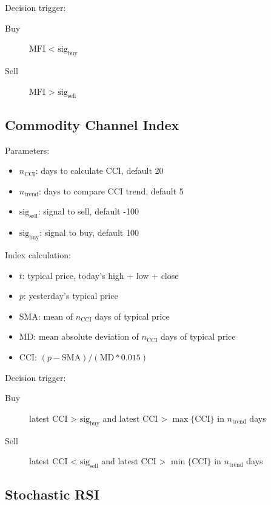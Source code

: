\documentclass{article}
\begin{document}
Decision trigger:
\begin{description}
    \item[Buy] $\text{MFI}$ < $\text{sig}_{\text{buy}}$
    \item[Sell] $\text{MFI}$ > $\text{sig}_{\text{sell}}$
\end{description}


\subsection{Commodity Channel Index}

Parameters\cite{stock-market-prediction-model-using-TPWS}:
\begin{itemize}
    \item $n_{\text{CCI}}$: days to calculate CCI, default 20
    \item $n_{\text{trend}}$: days to compare CCI trend, default 5
    \item $\text{sig}_{\text{sell}}$: signal to sell, default -100
    \item $\text{sig}_{\text{buy}}$: signal to buy, default 100
\end{itemize}

Index calculation:
\begin{itemize}
    \item $t$: typical price, today's high + low + close
    \item $p$: yesterday's typical price
    \item $\text{SMA}$: mean of $n_{\text{CCI}}$ days of typical price
    \item $\text{MD}$: mean absolute deviation of $n_{\text{CCI}}$ days of typical price
    \item $\text{CCI}$: $(p - \text{SMA}) / (\text{MD} * 0.015)$
\end{itemize}

Decision trigger:
\begin{description}
    \item[Buy] latest CCI > $\text{sig}_{\text{buy}}$ and latest CCI > $\max\{\text{CCI}\}$ in $n_{\text{trend}}$ days
    \item[Sell] latest CCI < $\text{sig}_{\text{sell}}$ and latest CCI > $\min\{\text{CCI}\}$ in $n_{\text{trend}}$ days
\end{description}

\subsection{Stochastic RSI}
\end{document}
